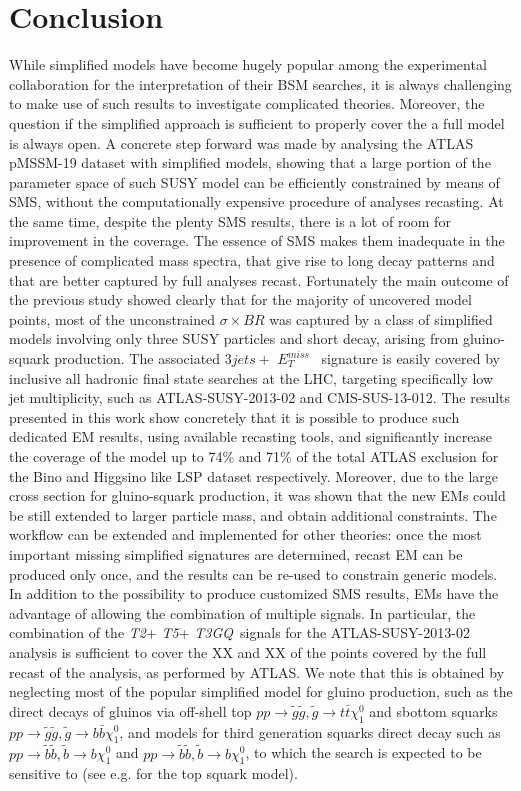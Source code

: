 \documentclass[a4paper,11pt]{article}
\newcommand{\MET}{{ $E_T ^{miss}$}}
\newcommand{\TGQ}{ \textit{T3GQ}}
\newcommand{\Ttwo}{ \textit{T2}}
\newcommand{\Tfive}{ \textit{T5}}
\begin{document}
\section{Conclusion}\label{sec:conclusion}
While simplified models have become hugely popular among the experimental collaboration for the interpretation of their BSM searches, it is always challenging to make use of such results to investigate complicated theories. Moreover, the question if the simplified approach is sufficient to properly cover the a full model is always open. A concrete step forward was made by analysing the ATLAS pMSSM-19 dataset with simplified models, showing that a large portion of the parameter space of such SUSY model can be efficiently constrained by means of SMS, without the computationally expensive procedure of analyses recasting. At the same time,  despite the plenty SMS results, there is a lot of room for improvement in the coverage. The essence of SMS makes them inadequate in the presence of  complicated mass spectra, that give rise to long decay patterns and that are better captured by full analyses recast. Fortunately the main outcome of the previous study showed clearly that for the majority of uncovered model points, most of the unconstrained $\sigma \times BR$ was captured by a class of simplified models involving only three SUSY particles and short decay, arising from gluino-squark production. The associated $3jets+$\MET~ signature is easily covered by inclusive all hadronic final state searches at the LHC, targeting specifically low jet multiplicity, such as ATLAS-SUSY-2013-02 and CMS-SUS-13-012. The results presented in this work show concretely that it is possible to produce such dedicated EM results, using available recasting tools, and significantly increase the coverage of the model up to 74$\%$ and 71$\%$ of the total ATLAS exclusion for the Bino and Higgsino like LSP dataset respectively. 
Moreover, due to the large cross section for gluino-squark production, it was shown that the new EMs could be still extended to larger particle mass, and obtain additional constraints. 
The workflow can be extended and implemented for other theories: once the most important missing simplified signatures are determined, recast EM can be produced only once, and the results can be re-used to constrain generic models. In addition to the possibility to produce customized SMS results, EMs have the advantage of allowing the combination of multiple signals. In particular, the combination of the \Ttwo+\Tfive+\TGQ~signals for the ATLAS-SUSY-2013-02 analysis is sufficient to cover the XX and XX of the points covered by the full recast of the analysis, as performed by ATLAS. We note that this is obtained by neglecting most of the popular simplified model for gluino production, such as the direct decays of gluinos via off-shell top $pp \rightarrow \tilde g \tilde g, \tilde g \rightarrow t \bar t \chi _1 ^0$ and sbottom squarks $pp \rightarrow \tilde g \tilde g, \tilde g \rightarrow b \bar b \chi _1 ^0$, and models for third generation squarks direct decay such as $pp \rightarrow \tilde b \tilde b, \tilde b \rightarrow b \chi _1 ^0$ and $pp \rightarrow \tilde b \tilde b, \tilde b \rightarrow b \chi _1 ^0$, to which the search is expected to be sensitive to (see e.g. \cite{Kraml:2016eti} for the top squark model). 
\end{document}
